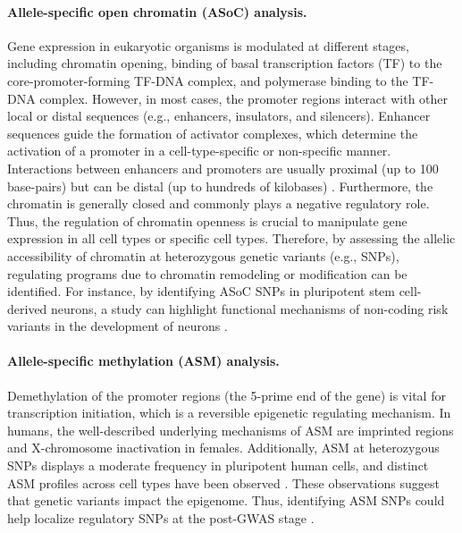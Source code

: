 \documentclass{book}
\begin{document}
\begin{refsection}
\paragraph*{Allele-specific open chromatin (ASoC) analysis.} Gene expression in eukaryotic organisms is modulated at different stages, including chromatin opening, binding of basal transcription factors (TF) to the core-promoter-forming TF-DNA complex, and polymerase binding to the TF-DNA complex.
However, in most cases, the promoter regions interact with other local or distal sequences (e.g., enhancers, insulators, and silencers).
Enhancer sequences guide the formation of activator complexes, which determine the activation of a promoter in a cell-type-specific or non-specific manner.
Interactions between enhancers and promoters are usually proximal (up to 100 base-pairs) but can be distal (up to hundreds of kilobases) \cite{Williamson2011Enhancers}.
Furthermore, the chromatin is generally closed and commonly plays a negative regulatory role.
Thus, the regulation of chromatin openness is crucial to manipulate gene expression in all cell types or specific cell types.
Therefore, by assessing the allelic accessibility of chromatin at heterozygous genetic variants (e.g., SNPs), regulating programs due to chromatin remodeling or modification can be identified.
For instance, by identifying ASoC SNPs in pluripotent stem cell-derived neurons, a study can highlight functional mechanisms of non-coding risk variants in the development of neurons \cite{Zhang2020Allele}.

\paragraph*{Allele-specific methylation (ASM) analysis.} Demethylation of the promoter regions (the 5-prime end of the gene) is vital for transcription initiation, which is a reversible epigenetic regulating mechanism.
In humans, the well-described underlying mechanisms of ASM are imprinted regions and X-chromosome inactivation in females.
Additionally, ASM at heterozygous SNPs displays a moderate frequency in pluripotent human cells, and distinct ASM profiles across cell types have been observed \cite{Shoemaker2010Allele}.
These observations suggest that genetic variants impact the epigenome.
Thus, identifying ASM SNPs could help localize regulatory SNPs at the post-GWAS stage \cite{Do2020Allele}.


\end{refsection}
\end{document}
